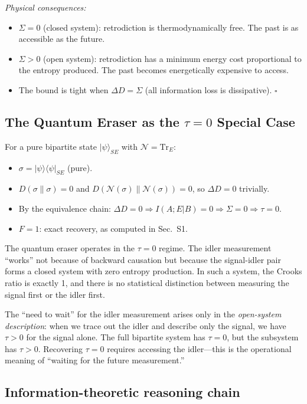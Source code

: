 \documentclass[prl,twocolumn,superscriptaddress,longbibliography]{revtex4-2}
\newcommand{\Tr}{\mathrm{Tr}}
\newcommand{\chan}{\mathcal{N}}
\newcommand{\ket}[1]{|#1\rangle}
\newcommand{\bra}[1]{\langle#1|}
\newcommand{\tauasym}{\tau}
\begin{document}
\emph{Physical consequences:}
\begin{itemize}
\item $\Sigma = 0$ (closed system): retrodiction is
  thermodynamically free. The past is as accessible as the future.
\item $\Sigma > 0$ (open system): retrodiction has a minimum energy
  cost proportional to the entropy produced. The past becomes
  energetically expensive to access.
\item The bound is tight when $\Delta D = \Sigma$ (all information
  loss is dissipative). \hfill$\square$
\end{itemize}

\subsection{The Quantum Eraser as the $\tauasym = 0$ Special Case}

For a pure bipartite state $\ket{\psi}_{SE}$ with $\chan = \Tr_E$:

\begin{itemize}
\item $\sigma = \ket{\psi}\bra{\psi}_{SE}$ (pure).
\item $D(\sigma\|\sigma) = 0$ and
  $D(\chan(\sigma)\|\chan(\sigma)) = 0$, so $\Delta D = 0$ trivially.
\item By the equivalence chain: $\Delta D = 0 \Rightarrow
  I(A;E|B) = 0 \Rightarrow \Sigma = 0 \Rightarrow \tauasym = 0$.
\item $F = 1$: exact recovery, as computed in Sec.~S1.
\end{itemize}

The quantum eraser operates in the $\tauasym = 0$ regime. The idler
measurement ``works'' not because of backward causation but because
the signal-idler pair forms a closed system with zero entropy
production. In such a system, the Crooks ratio is exactly 1, and
there is no statistical distinction between measuring the signal
first or the idler first.

The ``need to wait'' for the idler measurement arises only in the
\emph{open-system description}: when we trace out the idler and
describe only the signal, we have $\tauasym > 0$ for the signal
alone. The full bipartite system has $\tauasym = 0$, but the
subsystem has $\tauasym > 0$. Recovering $\tauasym = 0$ requires
accessing the idler---this is the operational meaning of ``waiting
for the future measurement.''

\subsection{Information-theoretic reasoning chain}
\end{document}
